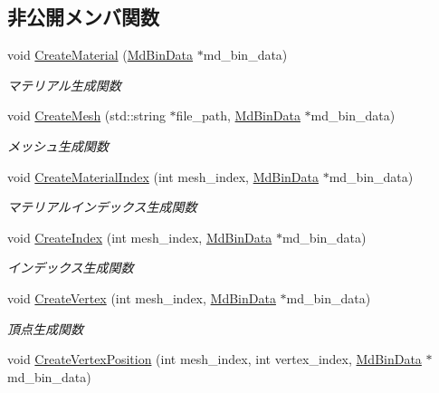 \subsection*{非公開メンバ関数}
\begin{DoxyCompactItemize}
\item 
void \mbox{\hyperlink{class_md_bin_object_aebdcf221ed6ebc7bd29fc84b808cb685}{Create\+Material}} (\mbox{\hyperlink{class_md_bin_data}{Md\+Bin\+Data}} $\ast$md\+\_\+bin\+\_\+data)
\begin{DoxyCompactList}\small\item\em マテリアル生成関数 \end{DoxyCompactList}\item 
void \mbox{\hyperlink{class_md_bin_object_a9a230129d19b15b7d2af7a31c68926c1}{Create\+Mesh}} (std\+::string $\ast$file\+\_\+path, \mbox{\hyperlink{class_md_bin_data}{Md\+Bin\+Data}} $\ast$md\+\_\+bin\+\_\+data)
\begin{DoxyCompactList}\small\item\em メッシュ生成関数 \end{DoxyCompactList}\item 
void \mbox{\hyperlink{class_md_bin_object_a9326c21a4838e13280fd87d74b37c1d9}{Create\+Material\+Index}} (int mesh\+\_\+index, \mbox{\hyperlink{class_md_bin_data}{Md\+Bin\+Data}} $\ast$md\+\_\+bin\+\_\+data)
\begin{DoxyCompactList}\small\item\em マテリアルインデックス生成関数 \end{DoxyCompactList}\item 
void \mbox{\hyperlink{class_md_bin_object_aa09679310d9da9037388cceabd1cb318}{Create\+Index}} (int mesh\+\_\+index, \mbox{\hyperlink{class_md_bin_data}{Md\+Bin\+Data}} $\ast$md\+\_\+bin\+\_\+data)
\begin{DoxyCompactList}\small\item\em インデックス生成関数 \end{DoxyCompactList}\item 
void \mbox{\hyperlink{class_md_bin_object_ad249dc88a2aeb1ce5ed7f5895ae53c18}{Create\+Vertex}} (int mesh\+\_\+index, \mbox{\hyperlink{class_md_bin_data}{Md\+Bin\+Data}} $\ast$md\+\_\+bin\+\_\+data)
\begin{DoxyCompactList}\small\item\em 頂点生成関数 \end{DoxyCompactList}\item 
void \mbox{\hyperlink{class_md_bin_object_aa940ac7c83ceacac11474b6e8239b83a}{Create\+Vertex\+Position}} (int mesh\+\_\+index, int vertex\+\_\+index, \mbox{\hyperlink{class_md_bin_data}{Md\+Bin\+Data}} $\ast$md\+\_\+bin\+\_\+data)

\end{DoxyCompactItemize}
